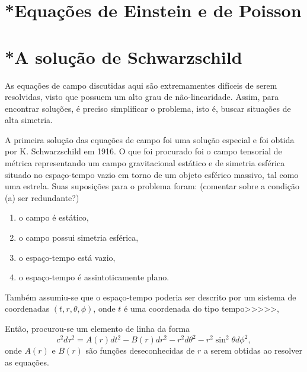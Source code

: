 \section{*Equações de Einstein e de Poisson}\label{sec:EinsteinPoisson}














\section{*A solução de Schwarzschild}\label{sec:Schwarzschild}

As equações de campo discutidas aqui são extremamentes difíceis de serem resolvidas, visto que possuem um alto grau de não-linearidade. Assim, para encontrar soluções, é preciso simplificar o problema, isto é, buscar situações de alta simetria.

A primeira solução das equações de campo foi uma solução especial e foi obtida por K. Schwarzschild em 1916. O que foi procurado foi o campo tensorial de métrica representando um campo gravitacional estático e de simetria esférica situado no espaço-tempo vazio em torno de um objeto esférico massivo, tal como uma estrela. Suas suposições para o problema foram: {\color{red}(comentar sobre a condição (a) ser redundante?)}
\begin{enumerate}[label=(\alph*)]
	\item o campo é estático,\label{sup:estatico}
	\item o campo possui simetria esférica,\label{sup:esferico}
	\item o espaço-tempo está vazio, \label{sup:vazio}
	\item o espaço-tempo é assintoticamente plano.\label{sup:plano}
\end{enumerate}

Também assumiu-se que o espaço-tempo poderia ser descrito por um sistema de coordenadas $(t,r,\theta,\phi)$, onde $t$ é uma coordenada do tipo tempo>>>>>, %

Então, procurou-se um elemento de linha da forma
\begin{equation}\label{eq:ElementoLinhaSchwarzschildPostulado}
	c^2d\tau^2=A(r)dt^2-B(r)dr^2-r^2d\theta^2-r^2\sin^2\theta d\phi^2,
\end{equation}
onde $A(r)$ e $B(r)$ são funções deseconhecidas de $r$ a serem obtidas ao resolver as equações.


